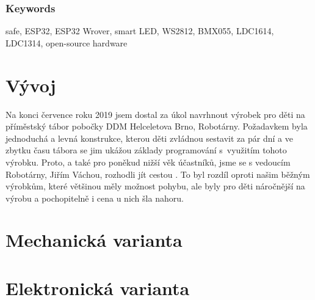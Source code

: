 \documentclass{template/socthesis}
\begin{document}
\subsection*{Keywords}
\color{black}
safe, ESP32, ESP32 Wrover, smart LED, WS2812, BMX055, LDC1614, LDC1314, open-source hardware

\newpage
\pagestyle{plain}

\tableofcontents %

\setcounter{figure}{0}
\setcounter{table}{0}
\newpage






\chapter{Vývoj}


Na konci července roku 2019 jsem dostal za úkol navrhnout výrobek pro děti na příměstský tábor
pobočky DDM Helceletova Brno, Robotárny. 
 Poža\-dav\-kem byla jednoduchá a levná konstrukce,
kterou děti zvládnou sestavit za pár dní a ve zbytku času tábora se jim ukážou základy programování
s~využitím tohoto výrobku. Proto, a také pro poněkud nižší věk účastníků, jsme se s vedoucím 
Robotárny, Jiřím Váchou, rozhodli jít cestou . To byl rozdíl oproti našim běžným 
výrobkům, které většinou měly možnost pohybu, ale byly pro děti náročnější na výrobu
a pochopitelně i cena u nich šla nahoru.










\chapter{Mechanická varianta} 





\newpage
\chapter{Elektronická varianta}
\end{document}
